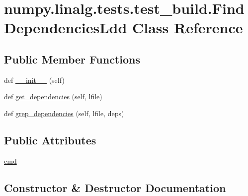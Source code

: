 \hypertarget{classnumpy_1_1linalg_1_1tests_1_1test__build_1_1FindDependenciesLdd}{}\section{numpy.\+linalg.\+tests.\+test\+\_\+build.\+Find\+Dependencies\+Ldd Class Reference}
\label{classnumpy_1_1linalg_1_1tests_1_1test__build_1_1FindDependenciesLdd}
\subsection*{Public Member Functions}
\begin{DoxyCompactItemize}
\item 
def \hyperlink{classnumpy_1_1linalg_1_1tests_1_1test__build_1_1FindDependenciesLdd_a67499cea5e2dcc0b48b4dd57f912fb34}{\+\_\+\+\_\+init\+\_\+\+\_\+} (self)
\item 
def \hyperlink{classnumpy_1_1linalg_1_1tests_1_1test__build_1_1FindDependenciesLdd_a48bf66fef5ef4962285ab79541a538e0}{get\+\_\+dependencies} (self, lfile)
\item 
def \hyperlink{classnumpy_1_1linalg_1_1tests_1_1test__build_1_1FindDependenciesLdd_ac28df5ebed0a8f625ca08946e032415e}{grep\+\_\+dependencies} (self, lfile, deps)
\end{DoxyCompactItemize}
\subsection*{Public Attributes}
\begin{DoxyCompactItemize}
\item 
\hyperlink{classnumpy_1_1linalg_1_1tests_1_1test__build_1_1FindDependenciesLdd_a8e977aded0e6e3671d273b837dac2c95}{cmd}
\end{DoxyCompactItemize}


\subsection{Constructor \& Destructor Documentation}
\mbox{\label{classnumpy_1_1linalg_1_1tests_1_1test__build_1_1FindDependenciesLdd_a67499cea5e2dcc0b48b4dd57f912fb34}} 
